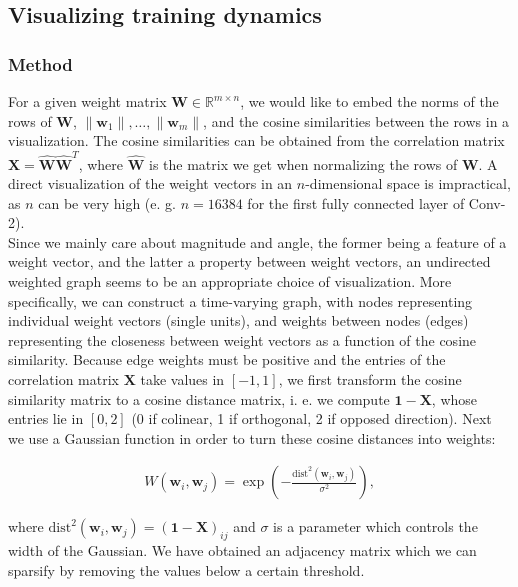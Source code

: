 \subsection{Visualizing training dynamics}

\subsubsection*{Method}
For a given weight matrix $\mathbf{W} \in \mathbb{R}^{m \times n}$, we would like to embed the norms of the rows of $\mathbf{W}$, $\|\mathbf{w}_1\|, \ldots, \|\mathbf{w}_m\|$, and the cosine similarities between the rows in a visualization. The cosine similarities can be obtained from the correlation matrix $\mathbf{X} = \hat{\mathbf{W}}\hat{\mathbf{W}}^T$, where $\hat{\mathbf{W}}$ is the matrix we get when normalizing the rows of $\textbf{W}$. A direct visualization of the weight vectors in an $n$-dimensional space is impractical, as $n$ can be very high (e. g. $n = 16384$ for the first fully connected layer of Conv-2). \\

Since we mainly care about magnitude and angle, the former being a feature of a weight vector, and the latter a property between weight vectors, an undirected weighted graph seems to be an appropriate choice of visualization. More specifically, we can construct a time-varying graph, with nodes representing individual weight vectors (single units), and weights between nodes (edges) representing the closeness between weight vectors as a function of the cosine similarity. Because edge weights must be positive and the entries of the correlation matrix $\mathbf{X}$ take values in $[-1, 1]$, we first transform the cosine similarity matrix to a cosine distance matrix, i. e. we compute $\mathbf{1} - \mathbf{X}$, whose entries lie in $[0, 2]$ (0 if colinear, 1 if orthogonal, 2 if opposed direction). Next we use a Gaussian function in order to turn these cosine distances into weights:

\begin{align*}
W(\textbf{w}_i, \textbf{w}_j) = \exp(-\frac{\text{dist}^2(\textbf{w}_i, \textbf{w}_j)}{\sigma^2}),
\end{align*}

where $\text{dist}^2(\textbf{w}_i, \textbf{w}_j) = (\mathbf{1} - \mathbf{X})_{ij}$ and $\sigma$ is a parameter which controls the width of the Gaussian. We have obtained an adjacency matrix which we can sparsify by removing the values below a certain threshold. \\


